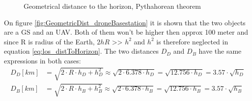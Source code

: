 \begin{figure}[H]
    \hfill
	\hfill
    \hfill
    \caption{Geometrical distance to the horizon, Pythahorean theorem}
\end{figure}

On figure \ref{fig:GeometricDist_droneBasestation} it is shown that the two objects are a GS and an UAV. Both of them won't be higher then approx 100 meter and since R is radius of the Earth, $2hR$ >> $h^2$ and $h^2$ is therefore neglected in equation \ref{eq:los_distToHorizon}. The two distances $D_D$ and $D_B$ have the same expressions in both cases:
\begin{align*}
	D_D [km] &= \sqrt{2\cdot R \cdot h_D + h_{D}^2} \approx \sqrt{2\cdot 6.378\cdot h_D} = \sqrt{12.756\cdot h_D} = 3.57\cdot \sqrt{h_D} \\
	D_B [km] &= \sqrt{2\cdot R \cdot h_B + h_{B}^2} \approx \sqrt{2\cdot 6.378\cdot h_B} = \sqrt{12.756\cdot h_B} = 3.57\cdot \sqrt{h_B}
\end{align*}

